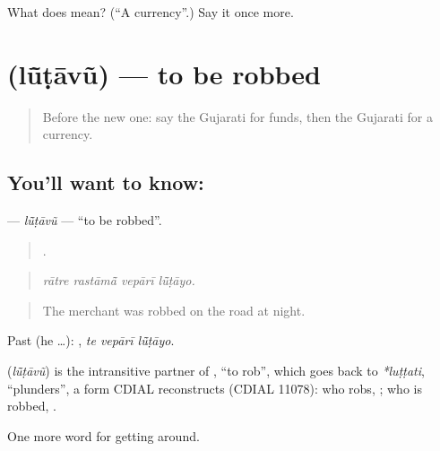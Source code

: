 \begin{tcolorbox}[breakable,colback=teal!4,colframe=teal!35!black,title={Before you move on}]
What does  mean? (\textquotedblleft{}A currency\textquotedblright{}.) Say it once more.
\end{tcolorbox}
\section[\texorpdfstring{\gu{લૂંટાવું} (lū̃ṭāvũ)}{લૂંટાવું (lū̃ṭāvũ)}]{ (lū̃ṭāvũ) — to be robbed}

\label{lesson:GU-C429-lutavu}



\begin{quote}
Before the new one: say the Gujarati for funds, then the Gujarati for a currency.
\end{quote}

\subsection*{You'll want to know: }
\textbf{} — \emph{lū̃ṭāvũ} — \textquotedblleft{}to be robbed\textquotedblright{}.

\begin{quote}
   .
\end{quote}

\begin{quote}
\emph{rātre rastāmā̃ vepārī lū̃ṭāyo.}
\end{quote}

\begin{quote}
The merchant was robbed on the road at night.
\end{quote}

Past (he …):   , \emph{te vepārī lū̃ṭāyo}.

\begin{cousinweb}
\textbf{} (\emph{lū̃ṭāvũ}) is the intransitive partner of , \textquotedblleft{}to rob\textquotedblright{}, which goes back to \emph{*luṭṭati}, \textquotedblleft{}plunders\textquotedblright{}, a form CDIAL reconstructs (CDIAL 11078): who robs, ; who is robbed, .
\end{cousinweb}

\begin{grammarlens}[title={What you've built}]
One more word for getting around.
\end{grammarlens}

